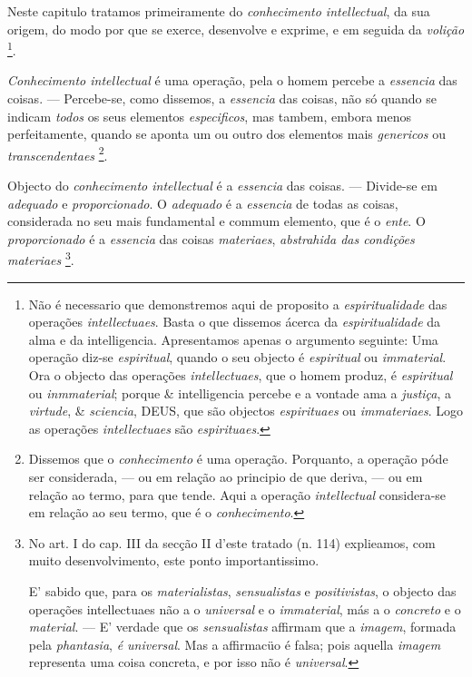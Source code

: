Neste capitulo tratamos primeiramente do \emph{conhecimento intellectual}, da sua origem, do modo por que se exerce, desenvolve e exprime, e em seguida da \emph{volição} \footnote{Não é necessario que demonstremos aqui de proposito a \emph{espiritualidade} das operações \emph{intellectuaes}. Basta o que dissemos ácerca da \emph{espiritualidade} da alma e da intelligencia. Apresentamos apenas o argumento seguinte: Uma operação diz-se \emph{espiritual}, quando o seu objecto é \emph{espiritual} ou \emph{immaterial}. Ora o objecto das operações \emph{intellectuaes}, que o homem produz, é \emph{espiritual} ou \emph{inmmaterial}; porque \& intelligencia percebe e a vontade ama a \emph{justiça}, a \emph{virtude}, \& \emph{sciencia}, \textsc{DEUS}, que são objectos \emph{espirituaes} ou \emph{immateriaes}. Logo as operações \emph{intellectuaes} são \emph{espirituaes}.}.


\emph{Conhecimento intellectual} é uma operação, pela o homem percebe a \emph{essencia} das coisas. --- Percebe-se, como dissemos, a \emph{essencia} das coisas, não só quando se indicam \emph{todos} os seus elementos \emph{especificos}, mas tambem, embora menos perfeitamente, quando se aponta um ou outro dos elementos mais \emph{genericos} ou \emph{transcendentaes} \footnote{Dissemos que o \emph{conhecimento} é uma operação. Porquanto, a operação póde ser considerada, --- ou em relação ao principio de que deriva, --- ou em relação ao termo, para que tende. Aqui a operação \emph{intellectual} considera-se em relação ao seu termo, que é o \emph{conhecimento}.}.


Objecto do \emph{conhecimento intellectual} é a \emph{essencia} das coisas. --- Divide-se em   \emph{adequado} e \emph{proporcionado}. O \emph{adequado} é a \emph{essencia} de todas as coisas, considerada no seu mais fundamental e commum elemento, que é o \emph{ente}. O \emph{proporcionado} é a \emph{essencia} das coisas \emph{materiaes}, \emph{abstrahida das condições materiaes} \footnote{No art. I do cap. III da secção II d'este tratado (n. 114) explieamos, com muito desenvolvimento, este ponto importantissimo.\par E' sabido que, para os \emph{materialistas}, \emph{sensualistas} e \emph{positivistas}, o objecto das operações intellectuaes não a o \emph{universal} e o \emph{immaterial}, más a o \emph{concreto} e o \emph{material}. --- E' verdade que os \emph{sensualistas} affirmam que a \emph{imagem}, formada pela \emph{phantasia}, \emph{é universal}. Mas a affirmacüo é falsa; pois aquella \emph{imagem} representa uma coisa concreta, e por isso não é \emph{universal}.}.

